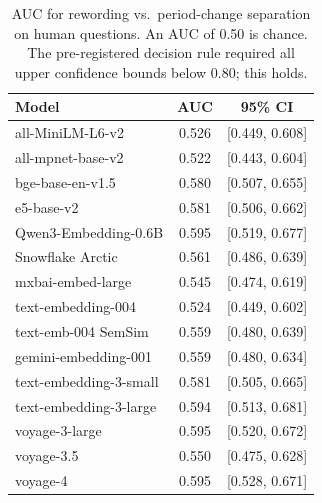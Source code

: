 \documentclass[11pt,a4paper]{article}
\begin{document}
\begin{table}[h]
\centering
\caption{AUC for rewording vs.\ period-change separation on human
questions. An AUC of 0.50 is chance. The pre-registered decision rule
required all upper confidence bounds below 0.80; this holds.}
\label{tab:auc}
\small
\begin{tabular}{@{}lcc@{}}
\toprule
Model & AUC & 95\% CI \\
\midrule
all-MiniLM-L6-v2      & 0.526 & [0.449, 0.608] \\
all-mpnet-base-v2      & 0.522 & [0.443, 0.604] \\
bge-base-en-v1.5       & 0.580 & [0.507, 0.655] \\
e5-base-v2             & 0.581 & [0.506, 0.662] \\
Qwen3-Embedding-0.6B   & 0.595 & [0.519, 0.677] \\
Snowflake Arctic       & 0.561 & [0.486, 0.639] \\
mxbai-embed-large      & 0.545 & [0.474, 0.619] \\
text-embedding-004     & 0.524 & [0.449, 0.602] \\
text-emb-004 SemSim    & 0.559 & [0.480, 0.639] \\
gemini-embedding-001   & 0.559 & [0.480, 0.634] \\
text-embedding-3-small & 0.581 & [0.505, 0.665] \\
text-embedding-3-large & 0.594 & [0.513, 0.681] \\
voyage-3-large         & 0.595 & [0.520, 0.672] \\
voyage-3.5             & 0.550 & [0.475, 0.628] \\
voyage-4               & 0.595 & [0.528, 0.671] \\
\bottomrule
\end{tabular}
\end{table}
\end{document}
